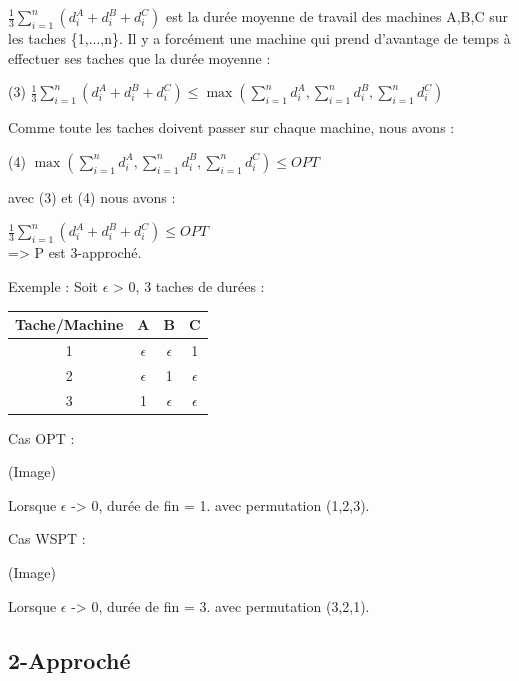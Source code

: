 \documentclass[12pt]{article}
\begin{document}
$\frac{1}{3}\displaystyle\sum_{i=1}^n(d_i^A+d_i^B+d_i^C)$ est la durée moyenne de travail des machines A,B,C sur les taches \{1,...,n\}. Il y a forcément une machine qui prend d'avantage de temps à effectuer ses taches que la durée moyenne :\\
\begin{center}
(3) $\frac{1}{3}\displaystyle\sum_{i=1}^n(d_i^A+d_i^B+d_i^C) \le \max(\displaystyle\sum_{i=1}^n d_i^A,\displaystyle\sum_{i=1}^n d_i^B,\displaystyle\sum_{i=1}^n d_i^C)$\\
\end{center}
Comme toute les taches doivent passer sur chaque machine, nous avons :\\
\begin{center}
(4) $\max(\displaystyle\sum_{i=1}^n d_i^A,\displaystyle\sum_{i=1}^n d_i^B,\displaystyle\sum_{i=1}^n d_i^C) \le OPT$\\
\end{center}
avec (3) et (4) nous avons :\\
\begin{center}
$\frac{1}{3}\displaystyle\sum_{i=1}^n(d_i^A+d_i^B+d_i^C) \le OPT$\\

=> P est 3-approché.
\end{center}
Exemple : Soit $\epsilon$ > 0, 3 taches de durées :\\
\begin{center}
\begin{tabular}{|c|c|c|c|}
\hline 
Tache/Machine & A & B & C \\ 
\hline 
1 & $\epsilon$ & $\epsilon$ & 1 \\ 
\hline 
2 & $\epsilon$ & 1 & $\epsilon$ \\ 
\hline 
3 & 1 & $\epsilon$ & $\epsilon$ \\ 
\hline 
\end{tabular} 
\end{center}
Cas OPT :

(Image)

Lorsque $\epsilon$ -> 0, durée de fin = 1. avec permutation (1,2,3).

Cas WSPT :

(Image)

Lorsque $\epsilon$ -> 0, durée de fin = 3. avec permutation (3,2,1).

\subsection{2-Approché}
\end{document}
